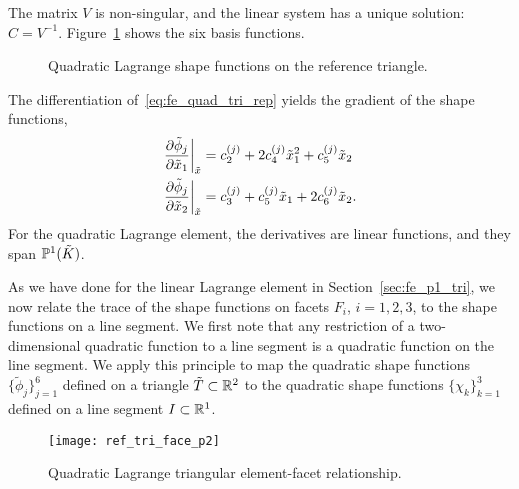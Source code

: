 The matrix $V$ is non-singular, and the linear system has a unique solution: $C = V^{-1}$.  Figure~\ref{fig:fe_shape_tri_p2} shows the six basis functions.
\begin{figure}
  \centering
  \caption{Quadratic Lagrange shape functions on the reference triangle.}
  \label{fig:fe_shape_tri_p2}
\end{figure}
 The differentiation of~\eqref{eq:fe_quad_tri_rep} yields the gradient of the shape functions,
\begin{align*}
  \left. \frac{\partial \tilde \phi_j}{\partial \tilde x_1} \right|_{\tilde x} &= c^{(j)}_2 + 2 c^{(j)}_4 \tilde x^2_1 + c^{(j)}_5 \tilde x_2
  \\
  \left. \frac{\partial \tilde \phi_j}{\partial \tilde x_2} \right|_{\tilde x}&= c^{(j)}_3 + c^{(j)}_5 \tilde x_1 + 2 c^{(j)}_6 \tilde x_2.
\end{align*}
For the quadratic Lagrange element, the derivatives are linear functions, and they span $\mathbb{P}^1(\tilde K)$.


As we have done for the linear Lagrange element in Section~\ref{sec:fe_p1_tri}, we now relate the trace of the shape functions on facets $F_i$, $i = 1,2,3$, to the shape functions on a line segment. We first note that any restriction of a two-dimensional quadratic function to a line segment is a quadratic function on the line segment.  We apply this principle to map the quadratic shape functions $\{\tilde \phi_j\}_{j=1}^6$ defined on a triangle $\tilde T \subset \mathbb{R}^2$ to the quadratic shape functions $\{ \chi_k \}_{k=1}^3$ defined on a line segment $I \subset \mathbb{R}^1$.

  
\begin{figure}
  \centering
  \texttt{[image: ref\_tri\_face\_p2]}
  \caption{Quadratic Lagrange triangular element-facet relationship.}
  \label{fig:fe_ref_tri_face_p2}
\end{figure}


